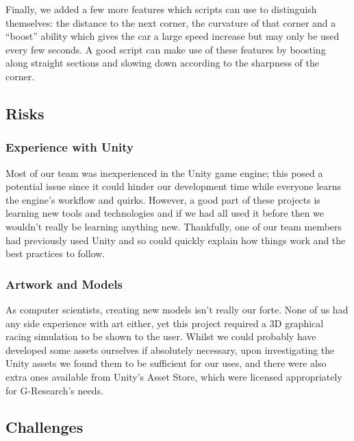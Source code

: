 Finally, we added a few more features which scripts can use to distinguish themselves: the distance to the next corner, the curvature of that corner and a ``boost'' ability which gives the car a large speed increase but may only be used every few seconds. A good script can make use of these features by boosting along straight sections and slowing down according to the sharpness of the corner.

\subsection{Risks}

\subsubsection{Experience with Unity}

Most of our team was inexperienced in the Unity game engine; this posed a
potential issue since it could hinder our development time while everyone learns
the engine's workflow and quirks. However, a good part of these projects is
learning new tools and technologies and if we had all used it before then we
wouldn't really be learning anything new. Thankfully, one of our team members
had previously used Unity and so could quickly explain how things work and the
best practices to follow.

\subsubsection{Artwork and Models}
As computer scientists, creating new models isn't really our forte. None of us
had any side experience with art either, yet this project required a 3D
graphical racing simulation to be shown to the user. Whilst we could probably
have developed some assets ourselves if absolutely necessary, upon investigating
the Unity assets we found them to be sufficient for our uses, and there were
also extra ones available from Unity's Asset Store, which were licensed
appropriately for G-Research's needs.

\subsection{Challenges}



